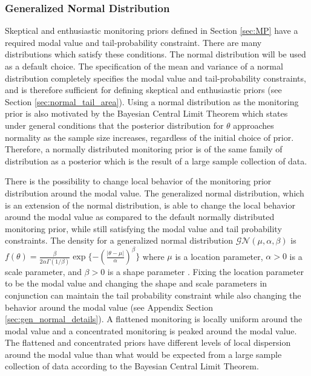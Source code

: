 \documentclass[useAMS,usenatbib,referee]{biom}
\begin{document}
\subsubsection{Generalized Normal Distribution}\label{sec:gen_normal}
Skeptical and enthusiastic monitoring priors defined in Section \ref{sec:MP} have a required modal value and tail-probability constraint. There are many distributions which satisfy these conditions. The normal distribution will be used as a default choice. The specification of the mean and variance of a normal distribution completely specifies the modal value and tail-probability constraints, and is therefore sufficient for defining skeptical and enthusiastic priors (see Section \ref{sec:normal_tail_area}). Using a normal distribution as the monitoring prior is also motivated by the Bayesian Central Limit Theorem which states under general conditions that the posterior distribution for $\theta$ approaches normality as the sample size increases, regardless of the initial choice of prior. Therefore, a normally distributed monitoring prior is of the same family of distribution as a posterior which is the result of a large sample collection of data.

There is the possibility to change local behavior of the monitoring prior distribution around the modal value. The generalized normal distribution, which is an extension of the normal distribution, is able to change the local behavior around the modal value as compared to the default normally distributed monitoring prior, while still satisfying the modal value and tail probability constraints. The density for a generalized normal distribution $\mathcal{GN}(\mu,\alpha,\beta)$ is
$
f(\theta)=\frac{\beta}{2\alpha\Gamma(1/\beta)}\exp\{-(\frac{|\theta-\mu|}{\alpha})^\beta\}
$ where $\mu$ is a location parameter, $\alpha>0$ is a scale parameter, and $\beta>0$ is a shape parameter \citep{Nadarajah2005}. Fixing the location parameter to be the modal value and changing the shape and scale parameters in conjunction can maintain the tail probability constraint while also changing the behavior around the modal value (see Appendix Section \ref{sec:gen_normal_details}). A flattened monitoring is locally uniform around the modal value and a concentrated monitoring is peaked around the modal value. The flattened and concentrated priors have different levels of local dispersion around the modal value than what would be expected from a large sample collection of data according to the Bayesian Central Limit Theorem.
\end{document}
